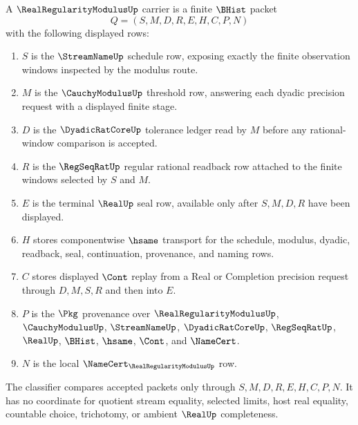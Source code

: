 \begin{definition}
\label{def:real-regularity-modulus-carrier}
A $\RealRegularityModulusUp$ carrier is a finite $\BHist$ packet
$$
Q=(S,M,D,R,E,H,C,P,N)
$$
with the following displayed rows:
\begin{enumerate}
\item $S$ is the $\StreamNameUp$ schedule row, exposing exactly the finite observation windows inspected by the modulus route.
\item $M$ is the $\CauchyModulusUp$ threshold row, answering each dyadic precision request with a displayed finite stage.
\item $D$ is the $\DyadicRatCoreUp$ tolerance ledger read by $M$ before any rational-window comparison is accepted.
\item $R$ is the $\RegSeqRatUp$ regular rational readback row attached to the finite windows selected by $S$ and $M$.
\item $E$ is the terminal $\RealUp$ seal row, available only after $S,M,D,R$ have been displayed.
\item $H$ stores componentwise $\hsame$ transport for the schedule, modulus, dyadic, readback, seal, continuation, provenance, and naming rows.
\item $C$ stores displayed $\Cont$ replay from a Real or Completion precision request through $D,M,S,R$ and then into $E$.
\item $P$ is the $\Pkg$ provenance over $\RealRegularityModulusUp$, $\CauchyModulusUp$, $\StreamNameUp$, $\DyadicRatCoreUp$, $\RegSeqRatUp$, $\RealUp$, $\BHist$, $\hsame$, $\Cont$, and $\NameCert$.
\item $N$ is the local $\NameCert_{\RealRegularityModulusUp}$ row.
\end{enumerate}
The classifier compares accepted packets only through $S,M,D,R,E,H,C,P,N$. It has no coordinate for quotient stream equality, selected limits, host real equality, countable choice, trichotomy, or ambient $\RealUp$ completeness.
\end{definition}

